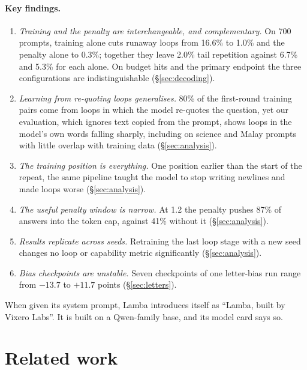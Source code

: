 \documentclass[11pt]{article}
\begin{document}
\paragraph{Key findings.}
\begin{enumerate}
  \item \emph{Training and the penalty are interchangeable, and complementary.} On 700 prompts, training alone cuts runaway loops from 16.6\% to 1.0\% and the penalty alone to 0.3\%; together they leave 2.0\% tail repetition against 6.7\% and 5.3\% for each alone. On budget hits and the primary endpoint the three configurations are indistinguishable (\S\ref{sec:decoding}).
  \item \emph{Learning from re-quoting loops generalises.} 80\% of the first-round training pairs come from loops in which the model re-quotes the question, yet our evaluation, which ignores text copied from the prompt, shows loops in the model's own words falling sharply, including on science and Malay prompts with little overlap with training data (\S\ref{sec:analysis}).
  \item \emph{The training position is everything.} One position earlier than the start of the repeat, the same pipeline taught the model to stop writing newlines and made loops worse (\S\ref{sec:analysis}).
  \item \emph{The useful penalty window is narrow.} At 1.2 the penalty pushes 87\% of answers into the token cap, against 41\% without it (\S\ref{sec:analysis}).
  \item \emph{Results replicate across seeds.} Retraining the last loop stage with a new seed changes no loop or capability metric significantly (\S\ref{sec:analysis}).
  \item \emph{Bias checkpoints are unstable.} Seven checkpoints of one letter-bias run range from $-13.7$ to $+11.7$ points (\S\ref{sec:letters}).
\end{enumerate}

When given its system prompt, Lamba introduces itself as ``Lamba, built by Vixero Labs''. It is built on a Qwen-family base, and its model card says so.

\section{Related work}
\end{document}
